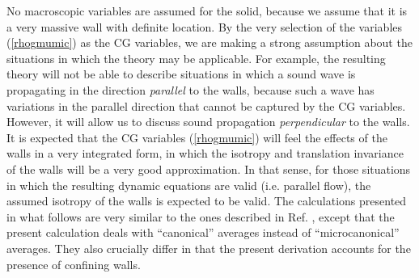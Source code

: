 \documentclass[b5paper,openright,10pt]{book}
\newcommand{\Note}[1]{{\bf \color{red}#1}}    %
\begin{document}
%

No macroscopic variables are assumed  for the solid, because we assume
that it  is a very massive  wall with definite location.   By the very
selection of the  variables (\ref{rhogmumic}) as the  CG variables, we
are  making a  strong assumption  about  the situations  in which  the
theory may be applicable.  For  example, the resulting theory will not
be able to describe situations in which a sound wave is propagating in
the direction \textit{parallel} to the  walls, because such a wave has
variations in the parallel direction that cannot be captured by the CG
variables.  However,  it will  allow us  to discuss  sound propagation
\textit{perpendicular}  to the  walls.   It is  expected  that the  CG
variables (\ref{rhogmumic})  will feel the  effects of the walls  in a
very integrated form, in which the isotropy and translation invariance
of the  walls will be a  very good approximation.  In  that sense, for
those situations  in which the  resulting dynamic equations  are valid
(i.e.  parallel flow),  the assumed isotropy of the  walls is expected
to be  valid.  The  calculations presented in what follows  are very
similar to  the ones described  in Ref. \cite{Donev}, except  that the
present  calculation  deals  with ``canonical''  averages  instead  of
``microcanonical''  averages.  They  also
crucially  differ in  that  the present  derivation  accounts for  the
presence of confining walls.
\end{document}
